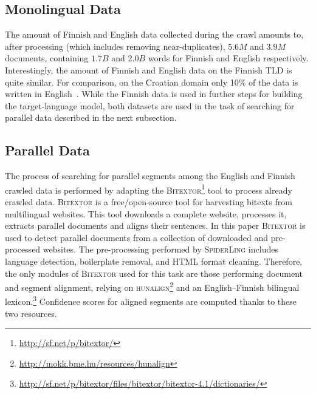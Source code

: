 \documentclass[postprint]{flammie}
\begin{document}
\subsection{Monolingual Data}
\label{subsection:monolingual_data}
%
The amount of Finnish and English data collected during the crawl amounts to, after processing (which includes removing near-duplicates), $5.6M$ and $3.9M$ documents, containing $1.7B$ and $2.0B$ words for Finnish and English respectively. Interestingly, the amount of Finnish and English data on the Finnish TLD is quite similar. For comparison, on the Croatian domain only 10\% of the data is written in English~\cite{ljubesic14-bs}. While the Finnish data is used in further steps for building the target-language %
model, both datasets are used in the task of searching for parallel data described in the next subsection.
%
%
%
\subsection{Parallel Data}
\label{subsection:parallel_data}
%
The process of searching for parallel segments among the English and Finnish crawled data is performed by adapting the \textsc{Bitextor}\footnote{\url{http://sf.net/p/bitextor/}} tool to process already crawled data. \textsc{Bitextor} is a free/open-source tool for harvesting bitexts from multilingual websites. This tool downloads a complete website, processes it, extracts parallel documents and aligns their sentences. In this paper \textsc{Bitextor} is used to detect parallel documents from a collection of downloaded and pre-processed websites. The pre-processing performed by \textsc{SpiderLing} includes language detection, boilerplate removal, and HTML format cleaning. Therefore, the only modules of \textsc{Bitextor} used for this task are those performing document and segment alignment, relying on \textsc{hunalign}\footnote{\url{http://mokk.bme.hu/resources/hunalign}} \cite{varga2007parallel} and an English--Finnish bilingual lexicon.\footnote{\url{http://sf.net/p/bitextor/files/bitextor/bitextor-4.1/dictionaries/}} Confidence scores for aligned segments are computed thanks to these two resources.
%
\end{document}
